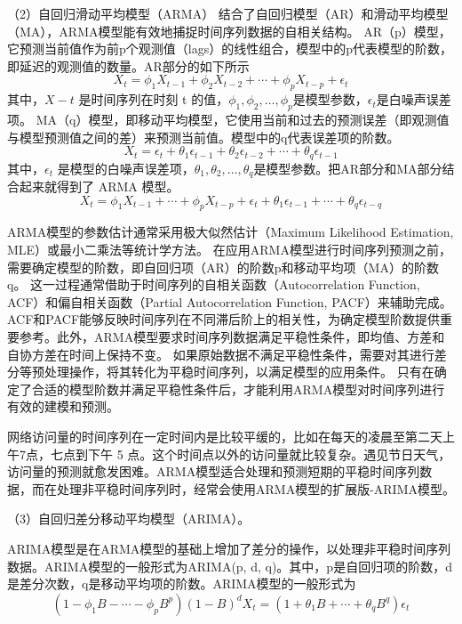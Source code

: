 （2）自回归滑动平均模型\cite{贾钟研2020基于时间序列的网络流量分析与预测}（ARMA）
结合了自回归模型（AR）和滑动平均模型（MA），ARMA模型能有效地捕捉时间序列数据的自相关结构。
AR（p）模型，它预测当前值作为前p个观测值（lags）的线性组合，模型中的p代表模型的阶数，
即延迟的观测值的数量。AR部分的如下所示
\begin{equation}
	X_t = \phi_1X_{t-1} + \phi_2X_{t - 2} + \cdots + \phi_pX_{t-p} + \epsilon_t
\end{equation}
其中，$X-t$ 是时间序列在时刻 t 的值，$\phi_1, \phi_2,\ldots,\phi_p$是模型参数，$\epsilon_t$是白噪声误差项。
MA（q）模型，即移动平均模型，它使用当前和过去的预测误差（即观测值与模型预测值之间的差）来预测当前值。模型中的q代表误差项的阶数。
\begin{equation}
	X_t = \epsilon_t + \theta_1\epsilon_{t-1} + \theta_2\epsilon_{t-2} + \cdots + \theta_q\epsilon_{t-1}
\end{equation}
其中，$\epsilon_t$ 是模型的白噪声误差项，$\theta_1, \theta_2, \ldots, \theta_q$是模型参数。把AR部分和MA部分结合起来就得到了 ARMA 模型。
\begin{equation}
	X_t = \phi_1X_{t-1} + \cdots  + \phi_pX_{t-p} + \epsilon_t + \theta_1\epsilon_{t-1} + \cdots + \theta_q\epsilon_{t-q}
\end{equation}

ARMA模型的参数估计通常采用极大似然估计（Maximum Likelihood Estimation, MLE）或最小二乘法等统计学方法。
在应用ARMA模型进行时间序列预测之前，需要确定模型的阶数，即自回归项（AR）的阶数p和移动平均项（MA）的阶数q。
这一过程通常借助于时间序列的自相关函数（Autocorrelation Function, ACF）和偏自相关函数（Partial Autocorrelation Function, PACF）来辅助完成。
ACF和PACF能够反映时间序列在不同滞后阶上的相关性，为确定模型阶数提供重要参考。此外，ARMA模型要求时间序列数据满足平稳性条件，即均值、方差和自协方差在时间上保持不变。
如果原始数据不满足平稳性条件，需要对其进行差分等预处理操作，将其转化为平稳时间序列，以满足模型的应用条件。
只有在确定了合适的模型阶数并满足平稳性条件后，才能利用ARMA模型对时间序列进行有效的建模和预测。

网络访问量的时间序列在一定时间内是比较平缓的，比如在每天的凌晨至第二天上午7点，七点到下午 5 点。这个时间点以外的访问量就比较复杂。遇见节日天气，访问量的预测就愈发困难。ARMA模型适合处理和预测短期的平稳时间序列数据，而在处理非平稳时间序列时，经常会使用ARMA模型的扩展版-ARIMA模型。

（3）自回归差分移动平均模型（ARIMA）。

ARIMA模型是在ARMA模型的基础上增加了差分的操作，以处理非平稳时间序列数据。ARIMA模型的一般形式为ARIMA(p, d, q)。其中，p是自回归项的阶数，d是差分次数，q是移动平均项的阶数。ARIMA模型的一般形式为
\begin{equation}
	(1 - \phi_1B - \cdots - \phi_pB^p)(1 - B)^dX_t = (1 + \theta_1B + \cdots + \theta_qB^q)\epsilon_t
\end{equation}

